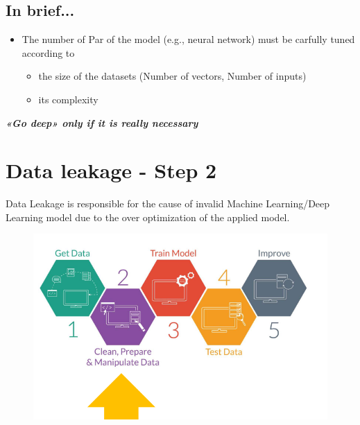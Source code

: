 \subsection{In brief...}
\begin{itemize}
    \item The number of Par of the model (e.g., neural network) must be carfully tuned according to
    \begin{itemize}
        \item the size of the datasets (Number of vectors, Number of inputs)
        \item its complexity 
    \end{itemize}
\end{itemize}

\noindent \textbf{\textit{«Go deep» only if it is really necessary }}


\section{Data leakage - Step 2}
\noindent Data Leakage is responsible for the cause of invalid Machine Learning/Deep Learning model due to the over optimization of the applied model.
\begin{figure}[H]
    \centering
    \includegraphics[width=0.8\linewidth]{07-08/images/step2.png}
\end{figure}

